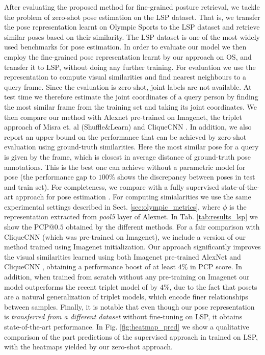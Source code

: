 \documentclass[10pt,twocolumn,letterpaper]{article}
\begin{document}
After evaluating the proposed method for fine-grained posture retrieval, we tackle the problem of zero-shot pose estimation on the LSP dataset. That is, we transfer the pose representation learnt on Olympic Sports to the LSP dataset and retrieve similar poses based on their similarity. The LSP \cite{lsp} dataset is one of the most widely used  benchmarks for pose estimation. In order to evaluate our model we then employ the fine-grained pose representation learnt by our approach on OS, and transfer it to LSP, without doing any further training. For evaluation we use the representation to compute visual similarities and find nearest neighbours to a query frame. Since the evaluation is zero-shot, joint labels are not available. At test time we therefore estimate the joint coordinates of a query person by finding the most similar frame from the training set and taking its joint coordinates. We then compare our method with Alexnet \cite{alexnet} pre-trained on Imagenet, the triplet approach of Misra et. al (Shuffle\&Learn) \cite{shuffleandlearn} and CliqueCNN \cite{cliquecnn}. In addition, we also report an upper bound on the performance that can be achieved by zero-shot evaluation using ground-truth similarities. Here the most similar pose for a query is given by the frame, which is closest in average distance of ground-truth pose annotations. This is the best one can achieve without a parametric model for pose (the performance gap to $100\%$ shows the discrepancy between poses in test and train set).
For completeness, we compare with a fully supervised state-of-the-art approach for pose estimation \cite{posemachines}. For computing simialarities we use the same experimental settings described in Sect. \ref{sec:olympic_metrics}, where $\phi$ is the representation extracted from \emph{pool5} layer of Alexnet. In Tab. \ref{tab:results_lsp} we show the PCP@$0.5$ obtained by the different methods. For a fair comparison with CliqueCNN \cite{cliquecnn} (which was pre-trained on Imagenet), we include a version of our method trained using Imagenet initialization. Our approach significantly improves the visual similarities learned using both Imagenet pre-trained AlexNet and CliqueCNN \cite{cliquecnn}, obtaining a performance boost of at least $4\%$ in PCP score. In addition, when trained from scratch without any pre-training on Imagenet our model outperforms the recent triplet model of \cite{shuffleandlearn} by $4\%$, due to the fact that posets are a natural generalization of triplet models, which encode finer relationships between samples. Finally, it is notable that even though our pose representation is \emph{transferred from a different dataset} without fine-tuning on LSP, it obtains state-of-the-art performance. In Fig. \ref{fig:heatmap_pred} we show a qualitative comparison of the part predictions of the supervised approach in \cite{deeppose} trained on LSP, with the heatmaps yielded by our zero-shot approach. 
\end{document}
